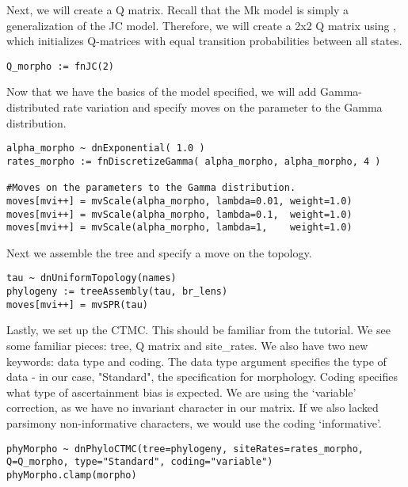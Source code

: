 Next, we will create a Q matrix. 
Recall that the Mk model is simply a generalization of the JC model.
Therefore, we will create a 2x2 Q matrix using , which initializes Q-matrices with equal transition probabilities between all states.

{\tt \begin{snugshade*}
\begin{lstlisting}
Q_morpho := fnJC(2)
\end{lstlisting}
\end{snugshade*}}

Now that we have the basics of the model specified, we will add Gamma-distributed rate variation and specify moves on the parameter to the Gamma distribution.


{\tt \begin{snugshade*}
\begin{lstlisting}
alpha_morpho ~ dnExponential( 1.0 )
rates_morpho := fnDiscretizeGamma( alpha_morpho, alpha_morpho, 4 )

#Moves on the parameters to the Gamma distribution.
moves[mvi++] = mvScale(alpha_morpho, lambda=0.01, weight=1.0)
moves[mvi++] = mvScale(alpha_morpho, lambda=0.1,  weight=1.0)
moves[mvi++] = mvScale(alpha_morpho, lambda=1,    weight=1.0)
\end{lstlisting}
\end{snugshade*}}

Next we assemble the tree and specify a move on the topology.

{\tt \begin{snugshade*}
\begin{lstlisting}
tau ~ dnUniformTopology(names)
phylogeny := treeAssembly(tau, br_lens)
moves[mvi++] = mvSPR(tau)
\end{lstlisting}
\end{snugshade*}}

Lastly, we set up the CTMC. 
This should be familiar from the  tutorial.
We see some familiar pieces: tree, Q matrix and site\_rates.
We also have two new keywords: data type and coding.
The data type argument specifies the type of data - in our case, "Standard", the specification for morphology.
Coding specifies what type of ascertainment bias is expected.
We are using the `variable' correction, as we have no invariant character in our matrix.
If we also lacked parsimony non-informative characters, we would use the coding `informative'. 

{\tt \begin{snugshade*}
\begin{lstlisting}
phyMorpho ~ dnPhyloCTMC(tree=phylogeny, siteRates=rates_morpho, Q=Q_morpho, type="Standard", coding="variable")
phyMorpho.clamp(morpho)
\end{lstlisting}
\end{snugshade*}}

